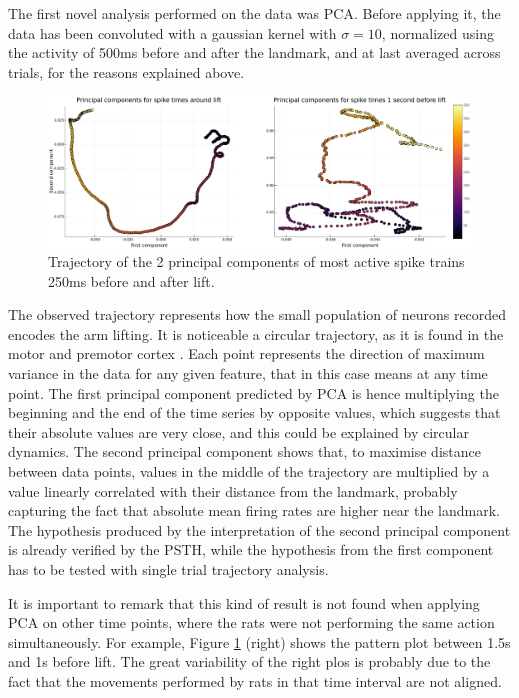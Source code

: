 
The first novel analysis performed on the data was PCA.	Before applying it, the data has been convoluted with a gaussian kernel with $\sigma=10$, normalized using the activity of 500ms before and after the landmark, and at last averaged across trials, for the reasons explained above.
\begin{figure}[h!]
	\centering
	\includegraphics[width=6.2in]{../../plots/pca-lift-vs-non-lift.pdf}
	\caption{Trajectory of the 2 principal components of most active spike trains 250ms before and after lift. 
}
	\label{fig:pca-500}
\end{figure}

The observed trajectory represents \cite{cunningham2014dimensionality} how the small population of neurons recorded encodes the arm lifting. It is noticeable a circular trajectory, as it is found in the motor and premotor cortex \cite{churchland2012neural}. 
Each point represents the direction of maximum variance in the data for any given feature, that in this case means at any time point. 
The first principal component predicted by PCA is hence multiplying the beginning and the end of the time series by opposite values, which suggests that their absolute values are very close, and this could be explained by circular dynamics. The second principal component shows that, to maximise distance between data points, values in the middle of the trajectory are multiplied by a value linearly correlated with their distance from the landmark, probably capturing the fact that absolute mean firing rates are higher near the landmark.\\
The hypothesis produced by the interpretation of the second principal component is already verified by the PSTH, while the hypothesis from the first component has to be tested with single trial trajectory analysis.

It is important to remark that this kind of result is not found when applying PCA on other time points, where the rats were not performing the same action simultaneously. For example, Figure \ref{fig:pca-500} (right) shows the pattern plot between 1.5s and 1s before lift. The great variability of the right plos is probably due to the fact that the movements performed by rats in that time interval are not aligned.

